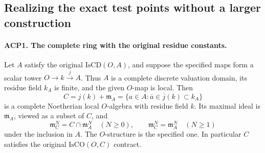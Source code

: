 \documentclass[11pt,a4paper]{article}
\numberwithin{equation}{section}
\theoremstyle{remark}\newtheorem{remark}[theorem]{Remark}
\begin{document}
\subsection{Realizing the exact test points without a larger construction}

\paragraph{ACP1. The complete ring with the original residue constants.}
\label{claim:ACP1}
Let \(A\) satisfy the original \(\mathrm{IsCD}(O,A)\), and
suppose the specified maps form a scalar tower
\(O\to k\overset{j}{\longrightarrow}A\).
Thus \(A\) is a complete discrete valuation domain, its residue
field \(k_A\) is finite, and the given \(O\)-map is local.
Then
\[
 C=j(k)+\mathfrak m_A
   =\{a\in A:\overline a\in\overline j(k)\subset k_A\}
                                                        \tag{ACP.7}
\]
is a complete Noetherian local \(O\)-algebra with residue field
\(k\).  Its maximal ideal is \(\mathfrak m_A\), viewed as a
subset of \(C\), and
\[
 \mathfrak m_C^N=C\cap\mathfrak m_A^N\quad(N\ge0),
 \qquad \mathfrak m_C^N=\mathfrak m_A^N\quad(N\ge1)
                                                        \tag{ACP.8}
\]
under the inclusion in \(A\).  The \(O\)-structure is the
specified one.  In particular \(C\) satisfies the original
\(\mathrm{IsCO}(O,C)\) contract.
\end{document}
